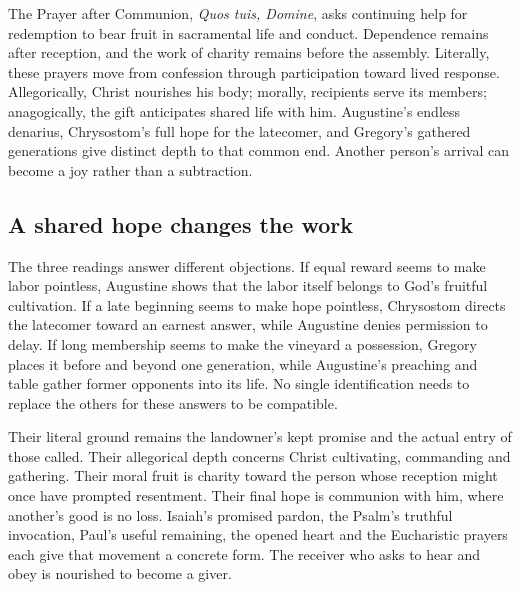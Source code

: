 The Prayer after Communion, \textit{Quos tuis, Domine}, asks continuing help for redemption to bear fruit in sacramental life and conduct. Dependence remains after reception, and the work of charity remains before the assembly. Literally, these prayers move from confession through participation toward lived response. Allegorically, Christ nourishes his body; morally, recipients serve its members; anagogically, the gift anticipates shared life with him. Augustine's endless denarius, Chrysostom's full hope for the latecomer, and Gregory's gathered generations give distinct depth to that common end. Another person's arrival can become a joy rather than a subtraction.

\subsection{A shared hope changes the work}
The three readings answer different objections. If equal reward seems to make labor pointless, Augustine shows that the labor itself belongs to God's fruitful cultivation. If a late beginning seems to make hope pointless, Chrysostom directs the latecomer toward an earnest answer, while Augustine denies permission to delay. If long membership seems to make the vineyard a possession, Gregory places it before and beyond one generation, while Augustine's preaching and table gather former opponents into its life. No single identification needs to replace the others for these answers to be compatible.

Their literal ground remains the landowner's kept promise and the actual entry of those called. Their allegorical depth concerns Christ cultivating, commanding and gathering. Their moral fruit is charity toward the person whose reception might once have prompted resentment. Their final hope is communion with him, where another's good is no loss. Isaiah's promised pardon, the Psalm's truthful invocation, Paul's useful remaining, the opened heart and the Eucharistic prayers each give that movement a concrete form. The receiver who asks to hear and obey is nourished to become a giver.
